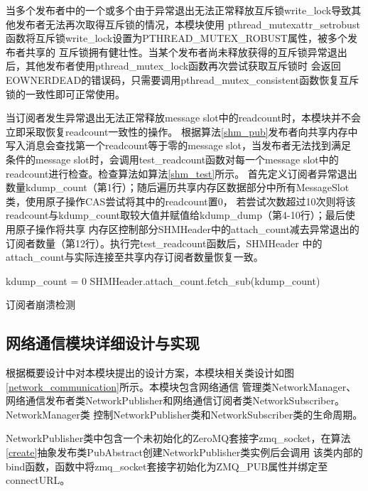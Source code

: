 当多个发布者中的一个或多个由于异常退出无法正常释放互斥锁write\_lock导致其他发布者无法再次取得互斥锁的情况，本模块使用
pthread\_mutexattr\_setrobust函数将互斥锁write\_lock设置为PTHREAD\_MUTEX\_ROBUST属性，被多个发布者共享的
互斥锁拥有健壮性。当某个发布者尚未释放获得的互斥锁异常退出后，其他发布者使用pthread\_mutex\_lock函数再次尝试获取互斥锁时
会返回EOWNERDEAD的错误码，只需要调用pthread\_mutex\_consistent函数恢复互斥锁的一致性即可正常使用。

当订阅者发生异常退出无法正常释放message slot中的readcount时，本模块并不会立即采取恢复readcount一致性的操作。
根据算法\ref{shm_pub}发布者向共享内存中写入消息会查找第一个readcount等于零的message slot，当发布者无法找到满足
条件的message slot时，会调用test\_readcount函数对每一个message slot中的readcount进行检查。检查算法如算法\ref{shm_test}所示。
首先定义订阅者异常退出数量kdump\_count（第1行）；随后遍历共享内存区数据部分中所有MessageSlot类，使用原子操作CAS尝试将其中的readcount置0，
若尝试次数超过10次则将该readcount与kdump\_count取较大值并赋值给kdump\_dump（第4-10行）；最后使用原子操作将共享
内存区控制部分SHMHeader中的attach\_count减去异常退出的订阅者数量（第12行）。执行完test\_readcount函数后，SHMHeader
中的attach\_count与实际连接至共享内存订阅者数量恢复一致。
\begin{algorithm}
  \small
  \SetAlgoLined
  kdump\_count = 0\;
  SHMHeader.attach\_count.fetch\_sub(kdump\_count)\;
  \caption{订阅者崩溃检测}
  \label{shm_test}
\end{algorithm}

\subsection{网络通信模块详细设计与实现}
根据概要设计中对本模块提出的设计方案，本模块相关类设计如图\ref{network_communication}所示。本模块包含网络通信
管理类NetworkManager、网络通信发布者类NetworkPublisher和网络通信订阅者类NetworkSubscriber。NetworkManager类
控制NetworkPublisher类和NetworkSubscriber类的生命周期。

NetworkPublisher类中包含一个未初始化的ZeroMQ套接字zmq\_socket，在算法\ref{create}抽象发布类PubAbstract创建NetworkPublisher类实例后会调用
该类内部的bind函数，函数中将zmq\_socket套接字初始化为ZMQ\_PUB属性并绑定至connectURL。

